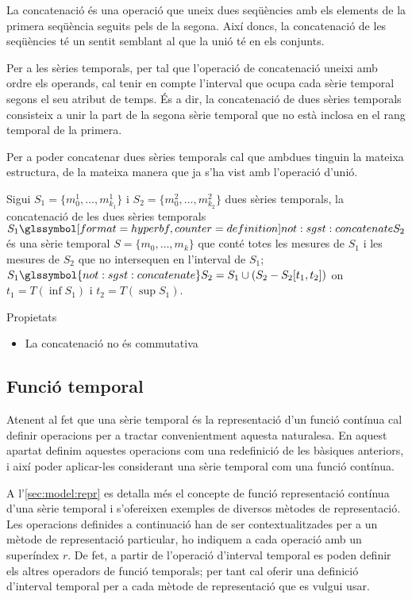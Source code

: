 La concatenació és una operació que uneix dues seqüències amb els
elements de la primera seqüència seguits pels de la segona. Així
doncs, la concatenació de les seqüències té un sentit semblant al que
la unió té en els conjunts. 

Per a les sèries temporals, per tal que l'operació de concatenació
uneixi amb ordre els operands, cal tenir en compte l'interval que
ocupa cada sèrie temporal segons el seu atribut de temps.  És a dir,
la concatenació de dues sèries temporals consisteix a unir la part de
la segona sèrie temporal que no està inclosa en el rang temporal de la
primera.

Per a poder concatenar dues sèries temporals cal que ambdues tinguin
la mateixa estructura, de la mateixa manera que ja s'ha vist amb
l'operació d'unió.


\begin{definition}[Concatenació]
  Sigui $S_1=\{m_0^1, \dotsc, m_{k_1}^1\}$ i $S_2=\{m_0^2, \dotsc,
  m_{k_2}^2\}$ dues sèries temporals, la concatenació de les dues
  sèries temporals $S_1 \glssymboldef{not:sgst:concatenate} S_2$ és
  una sèrie temporal $S=\{m_0, \dotsc, m_k\}$ que conté totes les
  mesures de $S_1$ i les mesures de $S_2$ que no intersequen en
  l'interval de $S_1$; $S_1 \glssymbol{not:sgst:concatenate} S_2 = S_1
  \cup ( S_2 - S_2[t_1,t_2] )$ on $t_1=T(\inf S_1)$ i $t_2=T(\sup
  S_1)$.
\end{definition}


Propietats
\begin{itemize}
\item La concatenació no és commutativa
\end{itemize}







\subsection{Funció temporal}
\label{sec:sgst:operadors-temporals}

Atenent al fet que una sèrie temporal és la representació d'un funció
contínua cal definir operacions per a tractar convenientment aquesta
naturalesa.
En aquest apartat definim aquestes operacions com una redefinició de
les bàsiques anteriors, i així poder aplicar-les considerant una sèrie
temporal com una funció contínua.  


A l'\autoref{sec:model:repr} es detalla més el concepte de funció
representació contínua d'una sèrie temporal i s'ofereixen exemples de
diversos mètodes de representació. Les operacions definides a
continuació han de ser contextualitzades per a un mètode de
representació particular, ho indiquem a cada operació amb un
superíndex $r$. De fet, a partir de l'operació d'interval temporal es
poden definir els altres operadors de funció temporals; per tant cal
oferir una definició d'interval temporal per a cada mètode de
representació que es vulgui usar.



